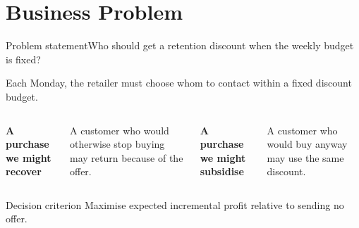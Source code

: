 \section{Business Problem}

\begin{frame}{Problem statement}{Who should get a retention discount when the weekly budget is fixed?}
  \vspace{0.15cm}
  {\Large Each Monday, the retailer must choose whom to contact within a fixed discount budget.\par}
  \vspace{0.5cm}
  \begin{columns}[T]
    {\Large\bfseries A purchase we might recover\par}
    \vspace{2pt}
    {\large A customer who would otherwise stop buying may return because of the offer.\par}
    {\Large\bfseries A purchase we might subsidise\par}
    \vspace{2pt}
    {\large A customer who would buy anyway may use the same discount.\par}
  \end{columns}
  \vspace{0.55cm}
  \begin{block}{Decision criterion}
    \large Maximise expected incremental profit relative to sending no offer.
  \end{block}
\end{frame}
